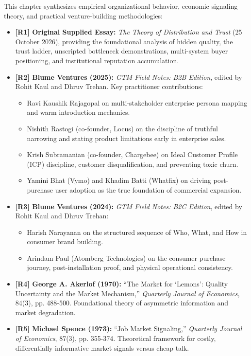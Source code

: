 This chapter synthesizes empirical organizational behavior, economic signaling theory, and practical venture-building methodologies:
\begin{itemize}
\item \textbf{[R1] Original Supplied Essay:} \emph{The Theory of Distribution and Trust} (25 October 2026), providing the foundational analysis of hidden quality, the trust ladder, unscripted bottleneck demonstrations, multi-system buyer positioning, and institutional reputation accumulation.
\item \textbf{[R2] Blume Ventures (2025):} \emph{GTM Field Notes: B2B Edition}, edited by Rohit Kaul and Dhruv Trehan. Key practitioner contributions:
  \begin{itemize}
  \item Ravi Kaushik Rajagopal on multi-stakeholder enterprise persona mapping and warm introduction mechanics.
  \item Nishith Rastogi (co-founder, Locus) on the discipline of truthful narrowing and stating product limitations early in enterprise sales.
  \item Krish Subramanian (co-founder, Chargebee) on Ideal Customer Profile (ICP) discipline, customer disqualification, and preventing toxic churn.
  \item Yamini Bhat (Vymo) and Khadim Batti (Whatfix) on driving post-purchase user adoption as the true foundation of commercial expansion.
  \end{itemize}
\item \textbf{[R3] Blume Ventures (2024):} \emph{GTM Field Notes: B2C Edition}, edited by Rohit Kaul and Dhruv Trehan:
  \begin{itemize}
  \item Harish Narayanan on the structured sequence of Who, What, and How in consumer brand building.
  \item Arindam Paul (Atomberg Technologies) on the consumer purchase journey, post-installation proof, and physical operational consistency.
  \end{itemize}
\item \textbf{[R4] George A. Akerlof (1970):} ``The Market for `Lemons': Quality Uncertainty and the Market Mechanism,'' \emph{Quarterly Journal of Economics}, 84(3), pp. 488-500. Foundational theory of asymmetric information and market degradation.
\item \textbf{[R5] Michael Spence (1973):} ``Job Market Signaling,'' \emph{Quarterly Journal of Economics}, 87(3), pp. 355-374. Theoretical framework for costly, differentially informative market signals versus cheap talk.

\end{itemize}
